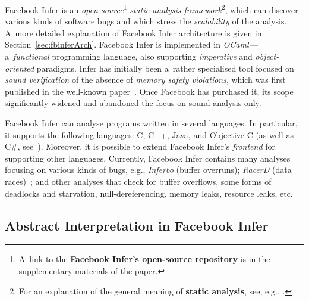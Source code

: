 \documentclass{ExcelAtFIT}
\theoremstyle{definition}
\begin{document}
Facebook Infer is an \emph{open-source}\footnote{A~link to the \textbf{Facebook Infer's open-source repository} is in the supplementary materials of the paper.} \emph{static analysis framework}\footnote{For an explanation of the general meaning of \textbf{static analysis}, see, e.g., \cite{staticAnalysisMoller, programAnalysisNielson, staticAnalysisRival}.}, which can discover various kinds of software bugs and which stress the \emph{scalability} of the analysis. A~more detailed explanation of Facebook Infer architecture is given in Section~\ref{sec:fbinferArch}. Facebook Infer is implemented in \emph{OCaml}\,---\,a~\emph{functional} programming language, also supporting \emph{imperative} and \emph{object-oriented} paradigms. Infer has initially been a~rather specialised tool focused on \emph{sound verification} of the absence of \emph{memory safety violations}, which was first published in the well-known paper~\cite{inferBiabduction}. Once Facebook has purchased it, its scope significantly widened and abandoned the focus on sound analysis only.

Facebook Infer can analyse programs written in several languages. In particular, it supports the following languages: C, C++, Java, and Objective-C (as well as C\#, see~\cite{inferCSharp}). Moreover, it is possible to extend Facebook Infer's \emph{frontend} for supporting other languages. Currently, Facebook Infer contains many analyses focusing on various kinds of bugs, e.g., \emph{Inferbo} (buffer overruns); \emph{RacerD} (data races)~\cite{racerD, staticRaceDetectorTruePositives}; and other analyses that check for buffer overflows, some forms of deadlocks and starvation, null-dereferencing, memory leaks, resource leaks, etc.

\subsection{Abstract Interpretation in Facebook Infer}
\end{document}
